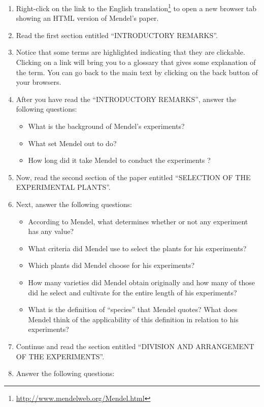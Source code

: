 \documentclass[]{book}
\providecommand{\tightlist}{%
  \setlength{\itemsep}{0pt}\setlength{\parskip}{0pt}}
\let\rmarkdownfootnote\footnote%
\def\footnote{\protect\rmarkdownfootnote}
\renewcommand{\href}[2]{#2\footnote{\url{#1}}}
\begin{document}
\begin{enumerate}
\def\labelenumi{\arabic{enumi}.}
\tightlist
\item
  Right-click on the link to the \href{http://www.mendelweb.org/Mendel.html}{English translation} to open a new browser tab showing an HTML version of Mendel's paper.
\item
  Read the first section entitled ``INTRODUCTORY REMARKS''.
\item
  Notice that some terms are highlighted indicating that they are clickable. Clicking on a link will bring you to a glossary that gives some explanation of the term. You can go back to the main text by clicking on the back button of your browsers.
\item
  After you have read the ``INTRODUCTORY REMARKS'', answer the following questions:

  \begin{itemize}
  \tightlist
  \item
    What is the background of Mendel's experiments?
  \item
    What set Mendel out to do?
  \item
    How long did it take Mendel to conduct the experiments ?
  \end{itemize}
\item
  Now, read the second section of the paper entitled ``SELECTION OF THE EXPERIMENTAL PLANTS''.
\item
  Next, answer the following questions:

  \begin{itemize}
  \tightlist
  \item
    According to Mendel, what determines whether or not any experiment has any value?
  \item
    What criteria did Mendel use to select the plants for his experiments?
  \item
    Which plants did Mendel choose for his experiments?
  \item
    How many varieties did Mendel obtain originally and how many of those did he select and cultivate for the entire length of his experiments?
  \item
    What is the definition of ``species'' that Mendel quotes? What does Mendel think of the applicability of this definition in relation to his experiments?
  \end{itemize}
\item
  Continue and read the section entitled ``DIVISION AND ARRANGEMENT OF THE EXPERIMENTS''.
\item
  Answer the following questions:


\end{enumerate}
\end{document}
